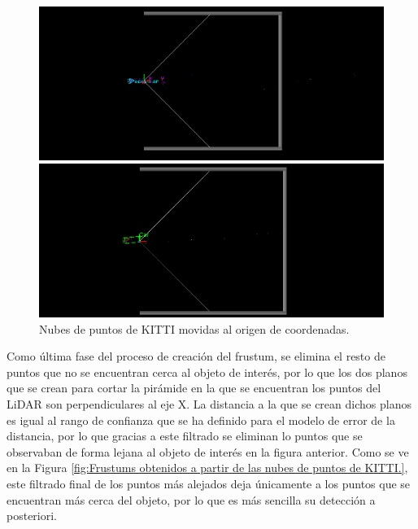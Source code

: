 \begin{figure}[H]
	\begin{minipage}{0.495\textwidth}
		\centering
		\includegraphics[width=1\linewidth]{Book/figures/7_roi/kitti_pcl_mov_0.png}
	\end{minipage}\hfill
	\begin{minipage}{0.495\textwidth}
		\centering
		\includegraphics[width=1\linewidth]{Book/figures/7_roi/kitti_pcl_mov_2.png}
	\end{minipage}
	\caption{Nubes de puntos de KITTI movidas al origen de coordenadas.}
	\label{fig:Nubes de puntos de KITTI movidas al origen de coordenadas.}
\end{figure}

Como última fase del proceso de creación del frustum, se elimina el resto de puntos que no se encuentran cerca al objeto de interés, por lo que los dos planos que se crean para cortar la pirámide en la que se encuentran los puntos del \ac{LiDAR} son perpendiculares al eje X. La distancia a la que se crean dichos planos es igual al rango de confianza que se ha definido para el modelo de error de la distancia, por lo que gracias a este filtrado se eliminan lo puntos que se observaban de forma lejana al objeto de interés en la figura anterior. Como se ve en la Figura \ref{fig:Frustums obtenidos a partir de las nubes de puntos de KITTI.}, este filtrado final de los puntos más alejados deja únicamente a los puntos que se encuentran más cerca del objeto, por lo que es más sencilla su detección a posteriori.

